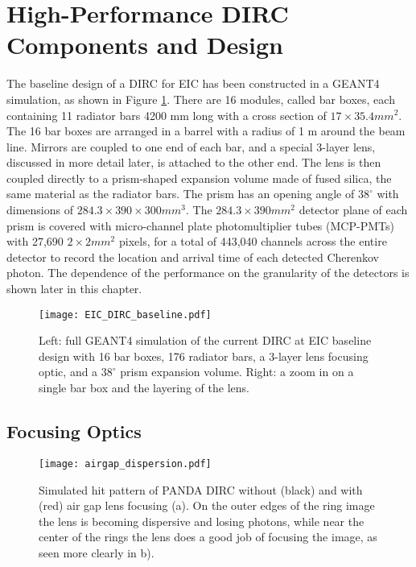 \section{High-Performance DIRC Components and Design}
The baseline design of a DIRC for EIC has been constructed in a GEANT4 simulation, as shown in Figure \ref{fig:baseline_design}. There are 16 modules, called bar boxes, each containing 11 radiator bars 4200 mm long with a cross section of $17\times35.4\unit{mm}^2$. The 16 bar boxes are arranged in a barrel with a radius of 1 m around the beam line. Mirrors are coupled to one end of each bar, and a special 3-layer lens, discussed in more detail later, is attached to the other end. The lens is then coupled directly to a prism-shaped expansion volume made of fused silica, the same material as the radiator bars. The prism has an opening angle of $38^\circ$ with dimensions of $284.3\times390\times300\unit{mm}^3$. The $284.3\times390\unit{mm}^2$ detector plane of each prism is covered with micro-channel plate photomultiplier tubes (MCP-PMTs) with 27,690 $2\times2\unit{mm}^2$ pixels, for a total of 443,040 channels across the entire detector to record the location and arrival time of each detected Cherenkov photon. The dependence of the performance on the granularity of the detectors is shown later in this chapter.

\begin{figure}[!htb]
	\centering
	\texttt{[image: EIC\_DIRC\_baseline.pdf]}
	\caption{Left: full GEANT4 simulation of the current DIRC at EIC baseline design with 16 bar boxes, 176 radiator bars, a 3-layer lens focusing optic, and a $38^\circ$ prism expansion volume. Right: a zoom in on a single bar box and the layering of the lens.}
	\label{fig:baseline_design}
\end{figure}

\subsection{Focusing Optics}

\begin{figure}[!htb]
	\centering
	\texttt{[image: airgap\_dispersion.pdf]}
	\caption{Simulated hit pattern of PANDA DIRC without (black) and with (red) air gap lens focusing (a). On the outer edges of the ring image the lens is becoming dispersive  and losing photons, while near the center of the rings the lens does a good job of focusing the image, as seen more clearly in b).}
	\label{fig:airgap_dispersion}
\end{figure}

